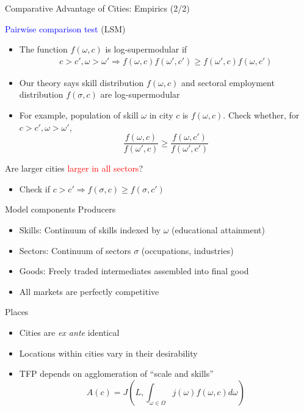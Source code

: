 \documentclass[10pt,notes=hide]{beamer}
\begin{document}
\begin{frame}{Comparative Advantage of Cities: Empirics (2/2)}

\textcolor{blue}{Pairwise comparison test} (LSM)
\begin{itemize}
\item The function $f(\omega,c)$ is log-supermodular if 
\begin{align*}
c>c',\omega>\omega'\Rightarrow f(\omega,c)f(\omega',c')\geq f(\omega',c)f(\omega,c')
\end{align*}

\item Our theory says skill distribution $f(\omega,c)$ and sectoral employment
distribution $f(\sigma,c)$ are log-supermodular 
\item For example, population of skill $\omega$ in city $c$ is $f(\omega,c)$.
Check whether, for $c>c',\omega>\omega'$,
\[
\frac{f(\omega,c)}{f(\omega',c)}\geq\frac{f(\omega,c')}{f(\omega',c')}
\]

\end{itemize}
Are larger cities \textcolor{red}{larger in all sectors}?
\begin{itemize}
\item Check if $c>c'\Rightarrow f(\sigma,c)\geq f(\sigma,c')$ 
\end{itemize}
\end{frame}
\begin{frame}{Model components}
Producers
\begin{itemize}
\item Skills: Continuum of skills indexed by $\omega$ (educational attainment)
\item Sectors: Continuum of sectors $\sigma$ (occupations, industries)
\item Goods: Freely traded intermediates assembled into final good
\item All markets are perfectly competitive
\end{itemize}
Places
\begin{itemize}
\item Cities are \emph{ex ante} identical
\item Locations within cities vary in their desirability
\item TFP depends on agglomeration of ``scale and skills''
\[
A(c)=J\left(L,\int_{\omega\in\Omega}j(\omega)f(\omega,c)d\omega\right)
\]
\end{itemize}
\end{frame}
\end{document}
